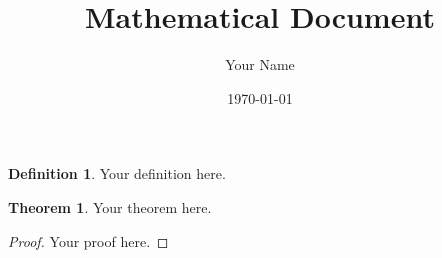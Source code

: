 \documentclass{article}
\title{Mathematical Document}
\author{Your Name}
\date{\today}
\theoremstyle{definition}
\newtheorem{theorem}{Theorem}
\newtheorem{definition}{Definition}
\begin{document}
\maketitle

\begin{definition}
Your definition here.
\end{definition}

\begin{theorem}
Your theorem here.
\end{theorem}

\begin{proof}
Your proof here.
\end{proof}
\end{document}
